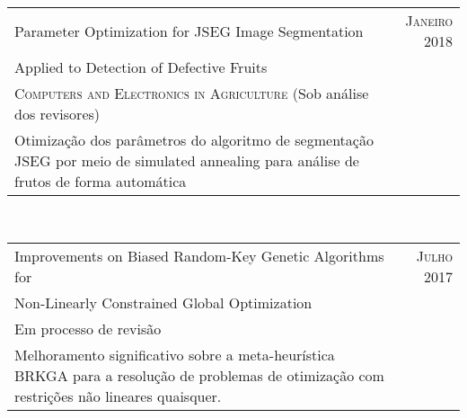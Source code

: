 \begin{tabular}{p{11cm}|r}
  Parameter Optimization for JSEG Image Segmentation & \textsc{Janeiro 2018} \\
  Applied to Detection of Defective Fruits & \\
  \textsc{Computers and Electronics in Agriculture} (Sob análise dos revisores) & \\
  \footnotesize{Otimização dos parâmetros do algoritmo de segmentação JSEG por meio de simulated annealing para análise de frutos de forma automática} & \\
\end{tabular}\\

\begin{tabular}{p{11cm}|r}
  Improvements on Biased Random-Key Genetic Algorithms for & \textsc{Julho 2017} \\
  Non-Linearly Constrained Global Optimization & \\
  Em processo de revisão & \\
  \footnotesize{Melhoramento significativo sobre a meta-heurística BRKGA para a resolução de problemas de otimização com restrições não lineares quaisquer.} & \\
\end{tabular}\\